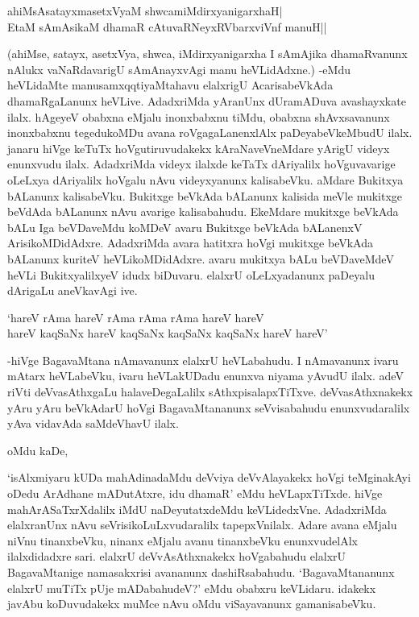 \begin{shloka}
ahiMsAsatayxmasetxVyaM shwcamiMdirxyanigarxhaH|\\
EtaM sAmAsikaM dhamaR cAtuvaRNeyxRV\s barxviVnf manuH||
\end{shloka}

(ahiMse, satayx, asetxVya, shwca, iMdirxyanigarxha I sAmAjika dhamaRvanunx nAlukx vaNaRdavarigU sAmAnayxvAgi manu heVLidAdxne.) -eMdu heVLidaMte manusamxqqtiyaMtahavu elalxrigU AcarisabeVkAda dhamaRgaLanunx heVLive. AdadxriMda yAranUnx dUramADuva avashayxkate ilalx. hAgeyeV obabxna eMjalu inonxbabxnu tiMdu, obabxna shAvxsavanunx inonxbabxnu tegedukoMDu avana roVgagaLanenxlAlx paDeyabeVkeMbudU ilalx. janaru hiVge keTuTx hoVgutiruvudakekx kAraNaveVneMdare yArigU videyx enunxvudu ilalx. AdadxriMda videyx ilalxde keTaTx dAriyalilx hoVguvavarige oLeLxya dAriyalilx hoVgalu nAvu videyxyanunx kalisabeVku. aMdare Bukitxya bALanunx kalisabeVku. Bukitxge beVkAda bALanunx kalisida meVle mukitxge beVdAda bALanunx nAvu avarige kalisabahudu. EkeMdare mukitxge beVkAda bALu Iga beVDaveMdu koMDeV avaru Bukitxge beVkAda bALanenxV ArisikoMDidAdxre. AdadxriMda avara hatitxra hoVgi mukitxge beVkAda bALanunx kuriteV heVLikoMDidAdxre. avaru mukitxya bALu beVDaveMdeV heVLi BukitxyalilxyeV idudx biDuvaru. elalxrU oLeLxyadanunx paDeyalu dArigaLu aneVkavAgi ive.

\begin{shloka}
`hareV rAma hareV rAma rAma rAma hareV hareV\\
hareV kaqSaNx hareV kaqSaNx kaqSaNx kaqSaNx hareV hareV'
\end{shloka}

-hiVge BagavaMtana nAmavanunx elalxrU heVLabahudu. I nAmavanunx ivaru mAtarx heVLabeVku, ivaru heVLakUDadu enunxva niyama yAvudU ilalx. adeV riVti deVvasAthxgaLu halaveDegaLalilx sAthxpisalapxTiTxve. deVvasAthxnakekx yAru yAru beVkAdarU hoVgi BagavaMtananunx seVvisabahudu enunxvudaralilx yAva vidavAda saMdeVhavU ilalx.

oMdu kaDe,

`isAlxmiyaru kUDa mahAdinadaMdu deVviya deVvAlayakekx hoVgi teMginakAyi oDedu ArAdhane mADutAtxre, idu dhamaR' eMdu heVLapxTiTxde. hiVge mahArASaTxrXdalilx iMdU naDeyutatxdeMdu keVLidedxVne. AdadxriMda elalxranUnx nAvu seVrisikoLuLxvudaralilx tapepxVnilalx. Adare avana eMjalu niVnu tinanxbeVku, ninanx eMjalu avanu tinanxbeVku enunxvudelAlx ilalxdidadxre sari. elalxrU deVvAsAthxnakekx hoVgabahudu elalxrU BagavaMtanige namasakxrisi avananunx dashiRsabahudu. `BagavaMtananunx elalxrU muTiTx pUje mADabahudeV?' eMdu obabxru keVLidaru. idakekx 
javAbu koDuvudakekx muMce nAvu oMdu viSayavanunx gamanisabeVku.

